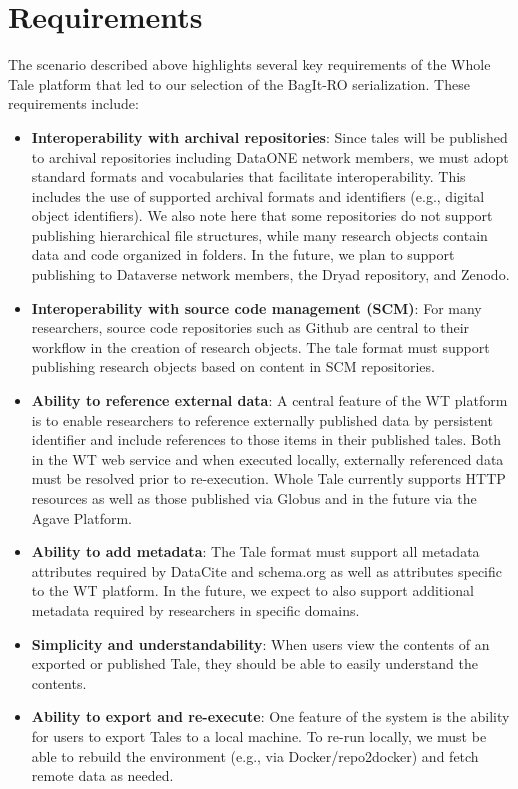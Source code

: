 \documentclass[conference]{IEEEtran}
\begin{document}
\section{Requirements}
The scenario described above highlights several key requirements of the Whole Tale platform that 
led to our selection of the BagIt-RO serialization.  These requirements include:

\begin{itemize}
\item{{\bf Interoperability with archival repositories}: Since tales will be published to archival repositories including DataONE network members, we must adopt standard formats and vocabularies that facilitate interoperability. This includes the use of supported archival formats and identifiers (e.g., digital object identifiers). We also note here that some repositories do not support publishing hierarchical file structures, while many research objects contain data and code organized in folders. In the future, we plan to support publishing to Dataverse network members, the Dryad repository, and Zenodo.}
\item{{\bf Interoperability with source code management (SCM)}: For many researchers, source code repositories such as Github are central to their workflow in the creation of research objects. The tale format must support publishing research objects based on content in SCM repositories.}
\item{{\bf Ability to reference external data}: A central feature of the WT platform is to enable researchers to reference externally published data by persistent identifier and include references to those items in their published tales. Both in the WT web service and when executed locally, externally referenced data must be resolved prior to re-execution. Whole Tale currently supports HTTP resources as well as those published via Globus and in the future via the Agave Platform.}
\item{{\bf Ability to add metadata}: The Tale format must support all metadata attributes required by DataCite and schema.org as well as attributes specific to the WT platform. In the future, we expect to also support additional metadata required by researchers in specific domains.}
\item{{\bf Simplicity and understandability}: When users view the contents of an exported or published Tale, they should be able to easily understand the contents.}
\item{{\bf Ability to export and re-execute}: One feature of the system is the ability for users to export Tales to a local machine. To re-run locally, we must be able to rebuild the environment (e.g., via Docker/repo2docker) and fetch remote data as needed.}

\end{itemize}
\end{document}
